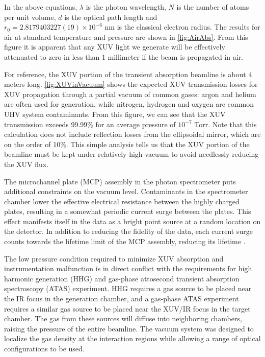 In the above equations, $\lambda$ is the photon wavelength, $N$ is the number of atoms per unit volume, $d$ is the optical path length and $r_0=2.8179403227(19) \times 10^{-6} \text{ nm}$ is the classical electron radius. The results for air at standard temperature and pressure are shown in \cref{fig:AirAbs}. From this figure it is apparent that any XUV light we generate will be effectively attenuated to zero in less than 1 millimeter if the beam is propagated in air.

For reference, the XUV portion of the transient absorption beamline is about 4 meters long. \cref{fig:XUVinVacuum} shows the expected XUV transmission losses for XUV propagation through a partial vacuum of common gases: argon and helium are often used for generation, while nitrogen, hydrogen and oxygen are common UHV system contaminants. From this figure, we can see that the XUV transmission exceeds 99.99\% for an average pressure of $10^{-7}$ Torr. Note that this calculation does not include reflection losses from the ellipsoidal mirror, which are on the order of 10\%. This simple analysis tells us that the XUV portion of the beamline must be kept under relatively high vacuum to avoid needlessly reducing the XUV flux.

The microchannel plate (MCP) assembly in the photon spectrometer puts additional constraints on the vacuum level.  Contaminants in the spectrometer chamber lower the effective electrical resistance between the highly charged plates, resulting in a somewhat periodic current surge between the plates. This effect manifests itself in the data as a bright point source at a random location on the detector. In addition to reducing the fidelity of the data, each current surge counts towards the lifetime limit of the MCP assembly, reducing its lifetime \cite{ladislaswizaMicrochannelPlateDetectors1979}.

The low pressure condition required to minimize XUV absorption and instrumentation malfunction is in direct conflict with the requirements for high harmonic generation (HHG) and gas-phase attosecond transient absorption spectroscopy (ATAS) experiment. HHG requires a gas source to be placed near the IR focus in the generation chamber, and a gas-phase ATAS experiment requires a similar gas source to be placed near the XUV/IR focus in the target chamber. The gas from these sources will diffuse into neighboring chambers, raising the pressure of the entire beamline. The vacuum system was designed to localize the gas density at the interaction regions while allowing a range of optical configurations to be used.

